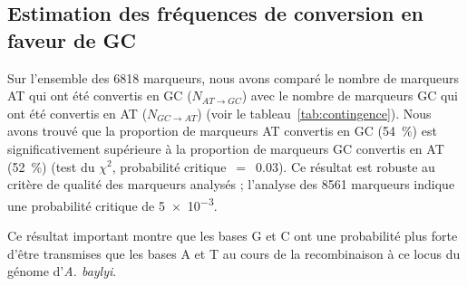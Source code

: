 \subsection{Estimation des fréquences de conversion en faveur de GC}
\label{subsec:result-freq}

Sur l'ensemble des \num{6818} marqueurs, nous avons comparé le nombre de
marqueurs AT qui ont été convertis en GC ($N_{AT \rightarrow GC}$) avec le
nombre de marqueurs GC qui ont été convertis en AT ($N_{GC \rightarrow AT}$)
(voir le tableau~\ref{tab:contingence}). Nous avons trouvé que la proportion de
marqueurs AT convertis en GC (\SI{54}{\percent}) est significativement
supérieure à la proportion de marqueurs GC convertis en AT (\SI{52}{\percent})
(test du $\chi^2$, probabilité critique~\(=\)~\num{0.03}). Ce résultat est
robuste au critère de qualité des marqueurs analysés ; l'analyse des \num{8561}
marqueurs indique une probabilité critique de \num{5e-3}.

Ce résultat important montre que les bases G et C ont une probabilité plus
forte d'être transmises que les bases A et T au cours de la recombinaison à ce
locus du génome d'\emph{A. baylyi}.

\newpage
